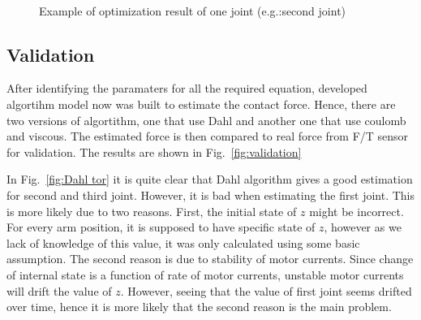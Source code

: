 \documentclass[letterpaper, 10 pt, conference]{ieeeconf}
\newcommand{\fref}[1]{Fig.~\ref{#1}}
\begin{document}
\begin{figure}
  \centering
  \,
  \,
  \caption{Example of optimization result of one joint (e.g.:second joint)}
  \label{fig:optimization}
\end{figure}

\subsection{Validation}
\label{validation}

After identifying the paramaters for all the required equation, developed algortihm model now was built to estimate the contact force. Hence, there are two versions of algortithm, one that use Dahl and another one that use coulomb and viscous. The estimated force is then compared to real force from F/T sensor for validation. The results are shown in \fref{fig:validation} 

In \fref{fig:Dahl tor} it is quite clear that Dahl algorithm gives a good estimation for second and third joint. However, it is bad when estimating the first joint. This is more likely due to two reasons. First, the initial state of $z$ might be incorrect. For every arm position, it is supposed to have specific state of $z$, however as we lack of knowledge of this value, it was only calculated using some basic assumption. The second reason is due to stability of motor currents. Since change of internal state is a function of rate of motor currents, unstable motor currents will drift the value of $z$. However, seeing that the value of first joint seems drifted over time, hence it is more likely that the second reason is the main problem.
\end{document}
